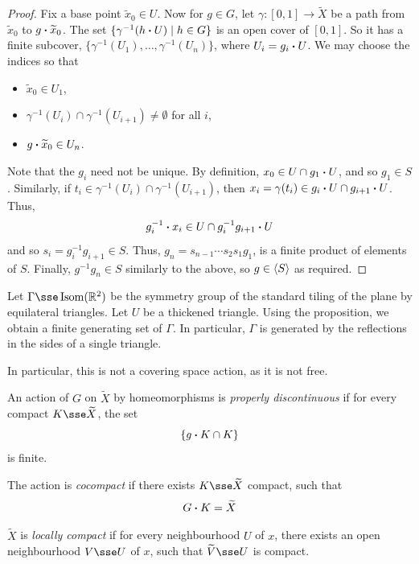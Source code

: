 \documentclass{article}
\begin{document}
\begin{proof}
    Fix a base point \(\widetilde x_0 \in U\). Now for \(g \in G\), let \(\gamma : [0, 1] \to \widetilde X\) be a path from \(\widetilde x_0\) to \(g \vdot \widetilde x_0\). The set \(\{\gamma^{-1}(h \vdot U) \mid h \in G\}\) is an open cover of \([0, 1]\). So it has a finite subcover, \(\{\gamma^{-1}(U_1), \dots, \gamma^{-1}(U_n)\}\), where \(U_i = g_i\vdot U\). We may choose the indices so that
    \begin{itemize}
        \item \(\widetilde x_0 \in U_1\),
        \item \(\gamma^{-1}(U_i) \cap \gamma^{-1}(U_{i+1}) \ne \emptyset\) for all \(i\),
        \item \(g\vdot \widetilde x_0 \in U_n\).
    \end{itemize}
    Note that the \(g_i\) need not be unique. By definition, \(x_0 \in U \cap g_1 \vdot U\), and so \(g_1 \in S\). Similarly, if \(t_i \in \gamma^{-1}(U_i) \cap \gamma^{-1}(U_{i+1})\), then \(x_i = \gamma(t_i) \in g_i \vdot U \cap g_{i+1} \vdot U\). Thus,
    \[g_i^{-1}\vdot x_i \in U \cap g_i^{-1}g_{i+1}\vdot U\]
    and so \(s_i = g_i^{-1}g_{i+1} \in S\). Thus, \(g_n = s_{n-1}\cdots s_2s_1g_1\), is a finite product of elements of \(S\). Finally, \(g^{-1}g_n \in S\) similarly to the above, so \(g \in \left\langle S \right\rangle\) as required.
\end{proof}

\begin{example}
    Let \(\Gamma \sse \Isom(\R^2)\) be the symmetry group of the standard tiling of the plane by equilateral triangles. Let \(U\) be a thickened triangle. Using the proposition, we obtain a finite generating set of \(\Gamma\). In particular, \(\Gamma\) is generated by the reflections in the sides of a single triangle.

    In particular, this is not a covering space action, as it is not free.
\end{example}

\begin{definition}
    An action of \(G\) on \(\widetilde X\) by homeomorphisms is \emph{properly discontinuous} if for every compact \(K \sse \widetilde X\), the set
    \[\{g \vdot K \cap K\}\]
    is finite.

    The action is \emph{cocompact} if there exists \(K \sse \widetilde X\) compact, such that
    \[G \vdot K = \widetilde X\]
    
    \(\widetilde X\) is \emph{locally compact} if for every neighbourhood \(U\) of \(x\), there exists an open neighbourhood \(V \sse U\) of \(x\), such that \(\widetilde V \sse U\) is compact.
\end{definition}
\end{document}
